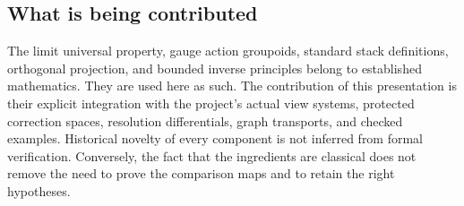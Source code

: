 \documentclass[11pt]{article}
\begin{document}
\subsection*{What is being contributed}
The limit universal property, gauge action groupoids, standard stack definitions, orthogonal projection, and bounded inverse principles belong to established mathematics. They are used here as such. The contribution of this presentation is their explicit integration with the project's actual view systems, protected correction spaces, resolution differentials, graph transports, and checked examples. Historical novelty of every component is not inferred from formal verification. Conversely, the fact that the ingredients are classical does not remove the need to prove the comparison maps and to retain the right hypotheses.

\clearpage\begingroup\setlength{\parskip}{0pt}\tableofcontents\endgroup
\clearpage{}






\appendix


\end{document}
